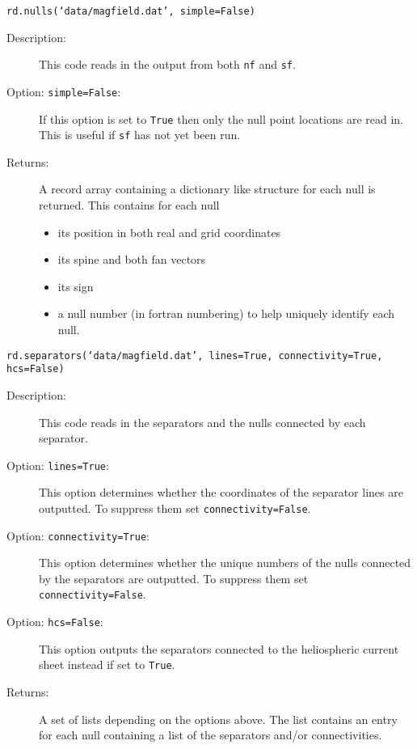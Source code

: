 \documentclass[12pt]{article}
\begin{document}
      \texttt{rd.nulls(`data/magfield.dat', simple=False)}

      \begin{description}
        \item [Description:] This code reads in the output from both \texttt{nf} and \texttt{sf}.
        \item [Option: \texttt{simple=False}:] If this option is set to \texttt{True} then only the null point locations are read in. This is useful if \texttt{sf} has not yet been run.
        \item [Returns:] A record array containing a dictionary like structure for each null is returned. This contains for each null
        \begin{itemize}
          \item its position in both real and grid coordinates
          \item its spine and both fan vectors
          \item its sign
          \item a null number (in fortran numbering) to help uniquely identify each null.
        \end{itemize}
      \end{description}

      \texttt{rd.separators(`data/magfield.dat', lines=True, connectivity=True, hcs=False)}

      \begin{description}
        \item [Description:] This code reads in the separators and the nulls connected by each separator.
        \item [Option: \texttt{lines=True}:] This option determines whether the coordinates of the separator lines are outputted. To suppress them set \texttt{connectivity=False}.
        \item [Option: \texttt{connectivity=True}:] This option determines whether the unique numbers of the nulls connected by the separators are outputted. To suppress them set \texttt{connectivity=False}.
        \item [Option: \texttt{hcs=False}:] This option outputs the separators connected to the heliospheric current sheet instead if set to \texttt{True}.
        \item [Returns:] A set of lists depending on the options above. The list contains an entry for each null containing a list of the separators and/or connectivities.
      \end{description}
\end{document}
